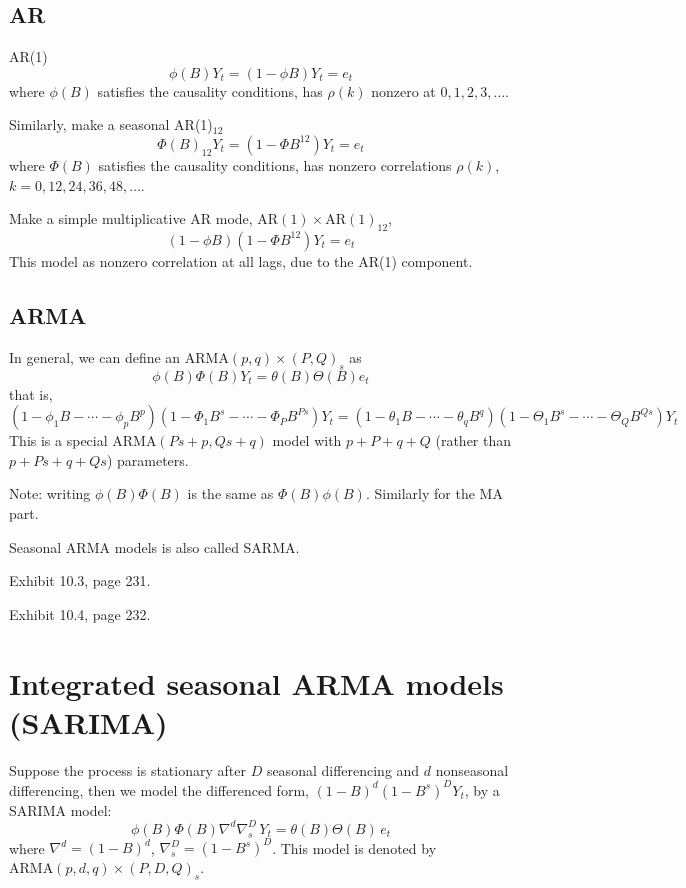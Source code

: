 \documentclass[12pt]{article}
\begin{document}
\subsection{AR}

AR(1)
\[
\phi(B)Y_t = (1 - \phi B)Y_t = e_t
\]
where $\phi(B)$ satisfies the causality conditions,
has $\rho(k)$ nonzero at $0, 1, 2, 3, \dotsc$.

Similarly, make a seasonal AR(1)$_{12}$
\[
\Phi(B)_{12} Y_t = (1 - \Phi B^{12})Y_t = e_t
\]
where $\Phi(B)$ satisfies the causality conditions,
has nonzero correlations $\rho(k)$, $k=0,12,24,36,48,\dotsc$.

Make a simple multiplicative AR mode,
$\text{AR}(1) \times \text{AR}(1)_{12}$,
\[
(1 - \phi B)(1 - \Phi B^{12}) Y_t = e_t
\]
This model as nonzero correlation at all lags,
due to the AR(1) component.

\subsection{ARMA}

In general, we can define an
$\text{ARMA}(p,q) \times (P,Q)_s$ as
\[
\phi(B) \Phi(B) Y_t = \theta(B)\Theta(B) e_t
\]
that is,
\[
(1 - \phi_1 B - \dotsb - \phi_p B^p)
    (1 - \Phi_1 B^s - \dotsb - \Phi_P B^{Ps}) Y_t
=
(1 - \theta_1 B - \dotsb - \theta_q B^q)
    (1 - \Theta_1 B^s - \dotsb - \Theta_Q B^{Qs}) Y_t
\]
This is a special
$\text{ARMA}(Ps + p, Qs + q)$ model with $p + P + q + Q$
(rather than $p + Ps + q + Qs$) parameters.

Note: writing $\phi(B) \Phi(B)$ is the same as $\Phi(B) \phi(B)$.
Similarly for the MA part.

Seasonal ARMA models is also called SARMA.

\example Exhibit 10.3, page 231.

\example Exhibit 10.4, page 232.

\section{Integrated seasonal ARMA models (SARIMA)}

Suppose the process is stationary after
$D$ seasonal differencing and $d$ nonseasonal differencing,
then we model the differenced form,
$(1 - B)^d (1 - B^s)^D Y_t$, by a SARIMA model:
\[
\phi(B) \Phi(B) \nabla^d \nabla^D_s \, Y_t
=
\theta(B) \Theta(B) \, e_t
\]
where
$\nabla^d = (1 - B)^d$,
$\nabla^D_s = (1 - B^s)^D$.
This model is denoted by
$\text{ARMA}(p,d,q) \times (P,D,Q)_s$.
\end{document}
